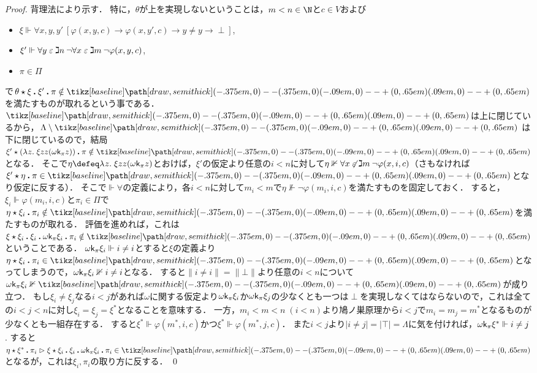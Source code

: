 \documentclass[realisability.tex]{subfiles}
\begin{document}
\begin{proof}
 背理法により示す．
 特に，$\theta$が上を実現しないということは，$m < n \in \N$と$c \in V$および
 \begin{itemize}
  \item $\xi \Vdash \forall x, y, y' \:[\varphi(x, y, c) \to \varphi(x, y', c) \to y \neq y \to \perp]$,
  \item $\xi' \Vdash \forall y \mathrel{\varepsilon} \gimel n \: \neg \forall x \mathrel{\varepsilon} \gimel m \: \neg \varphi(x, y, c)$,
  \item $\pi \in \Pi$
 \end{itemize}
 で$\KVM{\theta \xi {\xi'} \pi} \notin \pole$を満たすものが取れるという事である．
 $\pole$は上に閉じているから，$\Lambda \setminus \pole$ は下に閉じているので，結局$\KVM{{\xi'} {{(\abs{z}{\xi z z (\omega \conti_\pi z)})}} \pi } \notin \pole$となる．
 そこで$\eta \defeq \abs{z}{\xi z z (\omega \conti_\pi z)}$とおけば，$\xi'$の仮定より任意の$i < n$に対して$\eta \nVdash \forall x \not\mathrel{\varepsilon} \gimel m\:\neg \varphi(x, i, c)$（さもなければ$\xi' \cons \eta \push \pi \in \pole$となり仮定に反する）．
 そこで$\Vdash \forall$の定義により，各$i < n$に対して$m_i < m$で$\eta \nVdash  \neg \varphi(m_i, i, c)$を満たすものを固定しておく．
 すると，$\xi_i \Vdash \varphi(m_i, i, c)$と$\pi_i \in \Pi$で$\KVM{\eta {{\xi_i}} {{\pi_i}}} \notin \pole$を満たすものが取れる．
 評価を進めれば，これは$\KVM{{\xi} {{\xi_i}} {{\xi_i}} {{\omega \conti_\pi \xi_i}} {{\pi_i}}} \notin \pole$ということである．
 $\omega \mathsf{k}_\pi \xi_i \Vdash i \neq i$とすると$\xi$の定義より$\eta \cons \xi_i \push \pi_i \in \pole$となってしまうので，$\omega \mathsf{k}_\pi \xi_i \nVdash i \neq i$となる．
 すると$\|i \neq i\| = \|\bot\|$より任意の$i < n$について$\omega \conti_\pi \xi_i \nVdash \pole$が成り立つ．
 もし$\xi_i \neq \xi_j$なる$i < j$があれば$\omega$に関する仮定より$\omega \mathsf{k}_\pi \xi_i$か$\omega \mathsf{k}_\pi \xi_j$の少なくとも一つは$\perp$を実現しなくてはならないので，これは全ての$i < j < n$に対し$\xi_i = \xi_j = \xi^*$となることを意味する．
 一方，$m_i < m < n\;(i < n)$より鳩ノ巣原理から$i < j$で$m_i = m_j = m^*$となるものが少なくとも一組存在する．
 すると$\xi^* \Vdash \varphi(m^*, i, c)$かつ$\xi^* \Vdash \varphi(m^*, j, c)$．
 また$i < j$より$|i \neq j| = |\top| = \Lambda$に気を付ければ，$\omega \mathsf{k}_\pi \xi^* \Vdash i \neq j$.
 すると$\KVM{\eta {{\xi^*}} {{\pi_i}}} \reds \KVM{\xi {{\xi_i}} {{\xi_i}} {{\omega \conti_\pi \xi_i}}{{\pi_i}}} \in \pole$となるが，これは$\xi_i, \pi_i$の取り方に反する． \qed
\end{proof}
\end{document}

